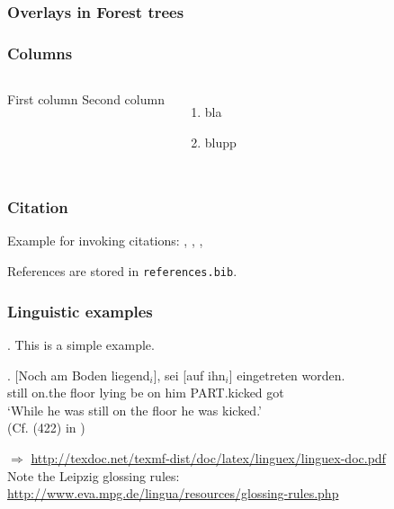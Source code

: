 \begin{frame}
\frametitle{Overlays in Forest trees}

\end{frame}
\begin{frame}
  \frametitle{Columns}

  \begin{columns}
    First column
		Second column
    \begin{enumerate}
    \item bla
    \item blupp
    \end{enumerate}
  \end{columns}

\end{frame}

\begin{frame}
\frametitle{Citation}
Example for invoking citations: \cite{Bech:63}, \citet[291]{Bech:63}, \citep{Bech:63}, \citealt{Bech:63}

References are stored in \texttt{references.bib}.
\end{frame}

\begin{frame}
\frametitle{Linguistic examples}
\ex. This is a simple example.

\exg. [Noch am Boden liegend$_i$], sei [auf ihn$_i$] eingetreten worden.\\
still on.the floor lying be on him PART.kicked got\\
`While he was still on the floor he was kicked.'\\
(Cf. (422) in \citealt{Mueller:02})

\noindent $\Rightarrow$ \url{http://texdoc.net/texmf-dist/doc/latex/linguex/linguex-doc.pdf} \\
Note the Leipzig glossing rules: \url{http://www.eva.mpg.de/lingua/resources/glossing-rules.php}
\end{frame}

